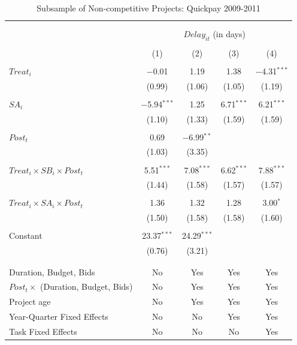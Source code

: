 \documentclass[]{article}
\begin{document}
\begin{table}[H] \centering 
  \caption{Subsample of Non-competitive Projects: Quickpay 2009-2011} 
  \label{} 
\small 
\begin{tabular}{@{\extracolsep{-2pt}}lcccc} 
\\[-1.8ex]\hline 
\hline \\[-1.8ex] 
\\[-1.8ex] & \multicolumn{4}{c}{$Delay_{it}$ (in days)} \\ 
\\[-1.8ex] & (1) & (2) & (3) & (4)\\ 
\hline \\[-1.8ex] 
 $Treat_i$ & $-$0.01 & 1.19 & 1.38 & $-$4.31$^{***}$ \\ 
  & (0.99) & (1.06) & (1.05) & (1.19) \\ 
  & & & & \\ 
 $SA_i$ & $-$5.94$^{***}$ & 1.25 & 6.71$^{***}$ & 6.21$^{***}$ \\ 
  & (1.10) & (1.33) & (1.59) & (1.59) \\ 
  & & & & \\ 
 $Post_t$ & 0.69 & $-$6.99$^{**}$ &  &  \\ 
  & (1.03) & (3.35) &  &  \\ 
  & & & & \\ 
 $Treat_i \times SB_i \times Post_t$ & 5.51$^{***}$ & 7.08$^{***}$ & 6.62$^{***}$ & 7.88$^{***}$ \\ 
  & (1.44) & (1.58) & (1.57) & (1.57) \\ 
  & & & & \\ 
 $Treat_i \times SA_i \times Post_t$ & 1.36 & 1.32 & 1.28 & 3.00$^{*}$ \\ 
  & (1.50) & (1.58) & (1.58) & (1.60) \\ 
  & & & & \\ 
 Constant & 23.37$^{***}$ & 24.29$^{***}$ &  &  \\ 
  & (0.76) & (3.21) &  &  \\ 
  & & & & \\ 
\hline \\[-1.8ex] 
Duration, Budget, Bids & No & Yes & Yes & Yes \\ 
$Post_t \times $  (Duration, Budget, Bids) & No & Yes & Yes & Yes \\ 
Project age & No & Yes & Yes & Yes \\ 
Year-Quarter Fixed Effects & No & No & Yes & Yes \\ 
Task Fixed Effects & No & No & No & Yes \\ 

\end{tabular}
\end{table}
\end{document}
